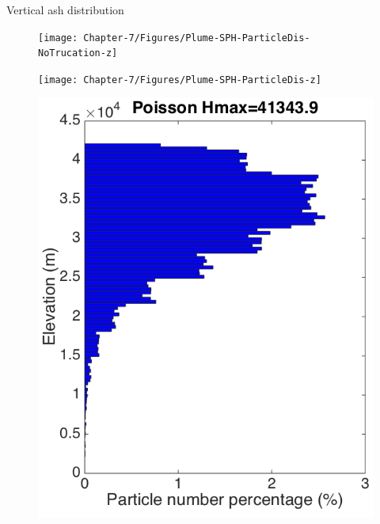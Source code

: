 \documentclass{beamer}
\begin{document}
\begin{frame}{Vertical ash distribution}
\begin{figure}
    \centering
    \begin{minipage}{.30 \textwidth}
        \centering
        \texttt{[image: Chapter-7/Figures/Plume-SPH-ParticleDis-NoTrucation-z]}
    \end{minipage}%
    \begin{minipage}{.30 \textwidth}
        \centering
        \texttt{[image: Chapter-7/Figures/Plume-SPH-ParticleDis-z]}
    \end{minipage}%
    \begin{minipage}{.30 \textwidth}
        \centering
        \includegraphics[width=0.90 \textwidth]{Chapter-7/Figures/Possion-Hmax40k-ParticleDis-z}
    \end{minipage}%
\end{figure}


\end{frame}
\end{document}

